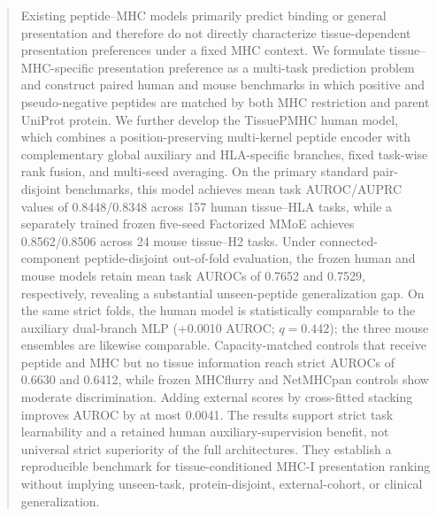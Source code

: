 \begin{abstract}
Existing peptide--MHC models primarily predict binding or general presentation and therefore do not directly characterize tissue-dependent presentation preferences under a fixed MHC context. We formulate tissue--MHC-specific presentation preference as a multi-task prediction problem and construct paired human and mouse benchmarks in which positive and pseudo-negative peptides are matched by both MHC restriction and parent UniProt protein. We further develop the TissuePMHC human model, which combines a position-preserving multi-kernel peptide encoder with complementary global auxiliary and HLA-specific branches, fixed task-wise rank fusion, and multi-seed averaging. On the primary standard pair-disjoint benchmarks, this model achieves mean task AUROC/AUPRC values of 0.8448/0.8348 across 157 human tissue--HLA tasks, while a separately trained frozen five-seed Factorized MMoE achieves 0.8562/0.8506 across 24 mouse tissue--H2 tasks. Under connected-component peptide-disjoint out-of-fold evaluation, the frozen human and mouse models retain mean task AUROCs of 0.7652 and 0.7529, respectively, revealing a substantial unseen-peptide generalization gap. On the same strict folds, the human model is statistically comparable to the auxiliary dual-branch MLP (+0.0010 AUROC; \(q=0.442\)); the three mouse ensembles are likewise comparable. Capacity-matched controls that receive peptide and MHC but no tissue information reach strict AUROCs of 0.6630 and 0.6412, while frozen MHCflurry and NetMHCpan controls show moderate discrimination. Adding external scores by cross-fitted stacking improves AUROC by at most 0.0041. The results support strict task learnability and a retained human auxiliary-supervision benefit, not universal strict superiority of the full architectures. They establish a reproducible benchmark for tissue-conditioned MHC-I presentation ranking without implying unseen-task, protein-disjoint, external-cohort, or clinical generalization.
\end{abstract}

